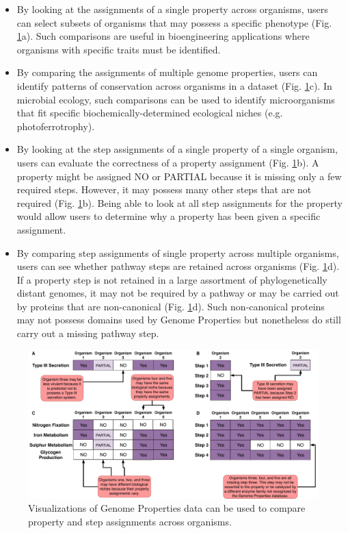 \begin{itemize}
\item By looking at the assignments of a single property across organisms, users can select subsets of organisms that may possess a specific phenotype (Fig. \ref{fig:client-analysis-types}a). Such comparisons are useful in bioengineering applications where organisms with specific traits must be identified.
\item By comparing the assignments of multiple genome properties, users can identify patterns of conservation across organisms in a dataset (Fig. \ref{fig:client-analysis-types}c). In microbial ecology, such comparisons can be used to identify microorganisms that fit specific biochemically-determined ecological niches (e.g. photoferrotrophy).
\item By looking at the step assignments of a single property of a single organism, users can evaluate the correctness of a property assignment (Fig. \ref{fig:client-analysis-types}b). A property might be assigned NO or PARTIAL because it is missing only a few required steps. However, it may possess many other steps that are not required (Fig. \ref{fig:client-analysis-types}b). Being able to look at all step assignments for the property would allow users to determine why a property has been given a specific assignment.
\item By comparing step assignments of single property across multiple organisms, users can see whether pathway steps are retained across organisms (Fig. \ref{fig:client-analysis-types}d). If a property step is not retained in a large assortment of phylogenetically distant genomes, it may not be required by a pathway or may be carried out by proteins that are non-canonical (Fig. \ref{fig:client-analysis-types}d). Such non-canonical proteins may not possess domains used by Genome Properties but nonetheless do still carry out a missing pathway step.
\end{itemize}

\begin{figure}[!ht]
  \centering
	\includegraphics[width=\textwidth]{media/analysis_types.pdf}
	 \caption{Visualizations of Genome Properties data can be used to compare property and step assignments across organisms.}
	 \label{fig:client-analysis-types}
\end{figure}

